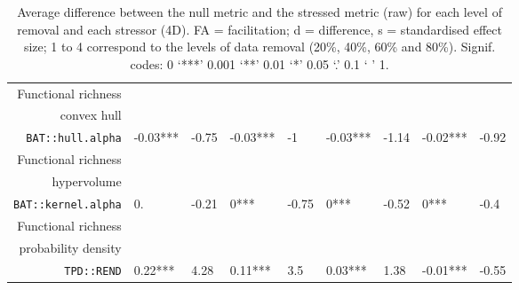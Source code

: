 \begin{table}[ht]
\begin{tabular}{rllllllll}
  Functional richness\\convex hull\\\texttt{BAT::hull.alpha} & -0.03*** & -0.75 & -0.03*** & -1 & -0.03*** & -1.14 & -0.02*** & -0.92 \\ 
  Functional richness\\hypervolume\\\texttt{BAT::kernel.alpha} & 0. & -0.21 & 0*** & -0.75 & 0*** & -0.52 & 0*** & -0.4 \\ 
  Functional richness\\probability density\\\texttt{TPD::REND} & 0.22*** & 4.28 & 0.11*** & 3.5 & 0.03*** & 1.38 & -0.01*** & -0.55 \\ 
   \hline
\end{tabular}
\caption{Average difference between the null metric and the stressed metric (raw) for each level of removal and each stressor (4D). FA = facilitation; d = difference, s = standardised effect size; 1 to 4 correspond to the levels of data removal (20\%, 40\%, 60\% and 80\%). Signif. codes:  0 ‘***’ 0.001 ‘**’ 0.01 ‘*’ 0.05 ‘.’ 0.1 ‘ ’ 1.} 
\end{table}
